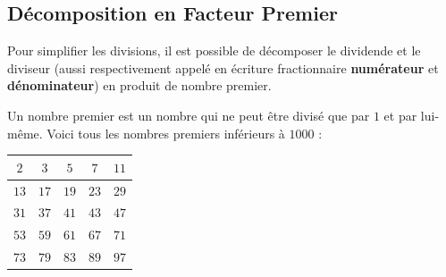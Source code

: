 \documentclass[a4paper, twoside]{article}
\begin{document}
			\vspace{4 mm}

\newpage


		\subsection{Décomposition en Facteur Premier}

			Pour simplifier les divisions, il est possible de décomposer 
			le dividende et le diviseur (aussi respectivement appelé en 
			écriture fractionnaire \textbf{numérateur} et \textbf{dénominateur}) en produit de nombre premier. 

			\vspace{2 mm}


			Un nombre premier est un nombre qui ne peut être divisé que par $1$ et par lui-même. 
			Voici tous les nombres premiers inférieurs à $1000$ :


			\begin{center}
				\renewcommand{\arraystretch}{1.8}
				\begin{tabular}{|c|c|c|c|c|}
					\hline
					 $2$ &   $3$ &   $5$ &   $7$ &  $11$ \\
					\hline
					$13$ &  $17$ &  $19$ &  $23$ &  $29$ \\
					\hline
					$31$ &  $37$ &  $41$ &  $43$ &  $47$ \\
					\hline
					$53$ &  $59$ &  $61$ &  $67$ &  $71$ \\
					\hline
					$73$ &  $79$ &  $83$ &  $89$ &  $97$ \\
					\hline
				\end{tabular}
			\end{center}
\end{document}
